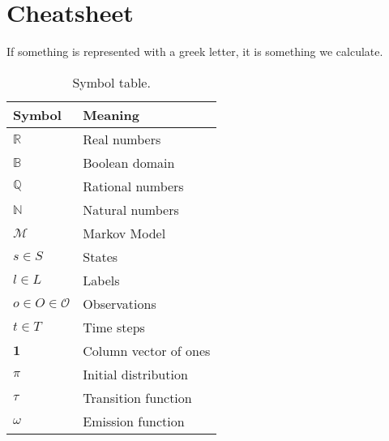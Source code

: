 \section{Cheatsheet}\label{sec:cheatsheet}
If something is represented with a greek letter, it is something we calculate.

\begin{table}[htb!]
    \centering
    \caption{Symbol table.}
    \begin{tabular}{ll}
        \toprule
        \textbf{Symbol}                 & \textbf{Meaning}                                \\
        \midrule
        $\mathbb{R}$                    & Real numbers                                    \\
        $\mathbb{B}$                    & Boolean domain                                  \\
        $\mathbb{Q}$                    & Rational numbers                                \\
        $\mathbb{N}$                    & Natural numbers                                 \\
        $\mathcal{M}$                   & Markov Model                                    \\
        $s \in S$                       & States                                          \\
        $l \in L$                       & Labels                                          \\
        $o \in O \in \mathcal{O}$       & Observations                                    \\
        $t \in T$                       & Time steps                                      \\
        $\mathbf{1}$                    & Column vector of ones                           \\
        $\pi$                           & Initial distribution                            \\
        $\tau$                          & Transition function                             \\
        $\omega$                        & Emission function                               \\

\end{tabular}
\end{table}
